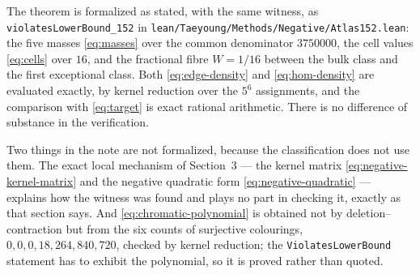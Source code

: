 \documentclass[11pt]{article}
\begin{document}
The theorem is formalized as stated, with the same witness, as
\texttt{violatesLowerBound\_152} in
\texttt{lean/Taeyoung/Methods/Negative/Atlas152.lean}: the five masses
\eqref{eq:masses} over the common denominator $3750000$, the cell values
\eqref{eq:cells} over $16$, and the fractional fibre $W=1/16$ between the bulk
class and the first exceptional class.  Both \eqref{eq:edge-density} and
\eqref{eq:hom-density} are evaluated exactly, by kernel reduction over the
$5^6$ assignments, and the comparison with \eqref{eq:target} is exact rational
arithmetic.  There is no difference of substance in the verification.

Two things in the note are not formalized, because the classification does not
use them.  The exact local mechanism of Section~3 --- the kernel matrix
\eqref{eq:negative-kernel-matrix} and the negative quadratic form
\eqref{eq:negative-quadratic} --- explains how the witness was found and plays
no part in checking it, exactly as that section says.  And
\eqref{eq:chromatic-polynomial} is obtained not by deletion--contraction but
from the six counts of surjective colourings, $0,0,0,18,264,840,720$, checked
by kernel reduction; the \texttt{ViolatesLowerBound} statement has to exhibit
the polynomial, so it is proved rather than quoted.
\end{document}
